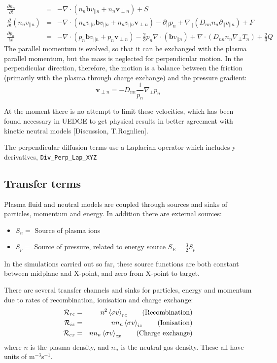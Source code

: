 \documentclass[12pt,a4paper]{article}
\begin{document}
\begin{eqnarray*}
  \frac{\partial n_n}{\partial t} &=& -\nabla\cdot\left(n_n\mathbf{b}v_{||n} + n_n\mathbf{v}_{\perp n}\right) + S\\
  \frac{\partial}{\partial t}\left(n_nv_{||n}\right) &=& -\nabla\cdot\left(n_nv_{||n} \mathbf{b}v_{||n} + n_nv_{||n}\mathbf{v}_{\perp n}\right) - \partial_{||}p_n + \nabla_{||}\left(D_{nn}n_n\partial_{||}v_{||n}\right) + F \\
  \frac{\partial p_n}{\partial t} &=& -\nabla\cdot\left(p_n\mathbf{b}v_{||n} + p_n\mathbf{v}_{\perp n}\right) - \frac{2}{3}p_n\nabla\cdot\left(\mathbf{b}v_{||n}\right) + \nabla\cdot\left(D_{nn}n_n\nabla_\perp T_n\right) + \frac{2}{3}Q
\end{eqnarray*}
The parallel momentum is evolved, so that it can be exchanged with the plasma parallel momentum, but the mass is neglected for perpendicular motion. In the perpendicular direction, therefore, the motion is a balance between the friction (primarily with the plasma through charge exchange) and the pressure gradient:
\begin{equation}
  \mathbf{v}_{\perp n} = -D_{nn}\frac{1}{p_n}\nabla_\perp p_n
\end{equation}

At the moment there is no attempt to limit these velocities, which has been found necessary in UEDGE to get physical results in better agreement with kinetic neutral models [Discussion, T.Rognlien].

The perpendicular diffusion terms use a Laplacian operator
which includes y derivatives, \texttt{Div\_Perp\_Lap\_XYZ}

\subsection{Transfer terms}

Plasma fluid and neutral models are coupled through sources and sinks of particles, momentum and energy.
In addition there are external sources:
\begin{itemize}
\item $S_n = $ Source of plasma ions
\item $S_p = $ Source of pressure, related to energy source $S_E = \frac{3}{2}S_p$
\end{itemize}
In the simulations carried out so far, these source functions are both constant between midplane and X-point, and zero
from X-point to target.

There are several transfer channels and sinks for particles, energy and momentum due to rates
of recombination, ionisation and charge exchange:
\begin{eqnarray*}
  \mathcal{R}_{rc} &=& n^2\left<\sigma v\right>_{rc}   \qquad \mbox{\textrm{(Recombination)}} \\
  \mathcal{R}_{iz} &=&  nn_n\left<\sigma v\right>_{iz} \qquad \mbox{\textrm{(Ionisation)}} \\
  \mathcal{R}_{cx} &=& nn_n\left<\sigma v\right>_{cx} \qquad \mbox{\textrm{(Charge exchange)}}
\end{eqnarray*}
where $n$ is the plasma density, and $n_n$ is the neutral gas density. These all have units of m$^{-3}$s$^{-1}$.
\end{document}
